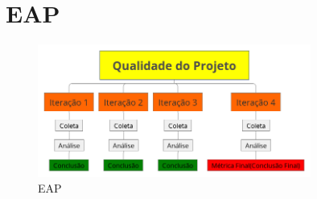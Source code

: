 \chapter{EAP}

\begin{figure}[H]
  \center
  \includegraphics[width=0.8\textwidth]{figuras/eap.png}
  \caption{EAP}
  \label{fig:eap}
\end{figure}